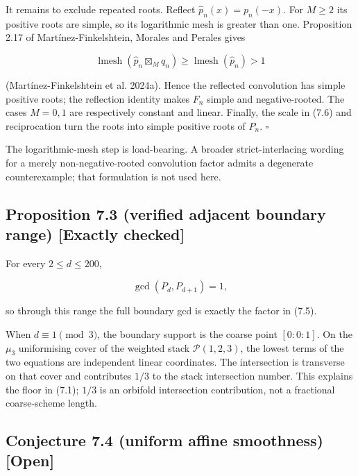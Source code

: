 \documentclass[
]{article}
\begin{document}
It remains to exclude repeated roots. Reflect
\(\widehat p_n(x)=p_n(-x)\). For \(M\ge2\) its positive roots are
simple, so its logarithmic mesh is greater than one. Proposition 2.17 of
Martínez-Finkelshtein, Morales and Perales gives

\[
\operatorname{lmesh}(\widehat p_n\boxtimes_Mq_n)
\ge \operatorname{lmesh}(\widehat p_n)>1
\]

(Martínez-Finkelshtein et al. 2024a). Hence the reflected convolution
has simple positive roots; the reflection identity makes \(F_n\) simple
and negative-rooted. The cases \(M=0,1\) are respectively constant and
linear. Finally, the scale in (7.6) and reciprocation turn the roots
into simple positive roots of \(P_n\). \(\square\)

The logarithmic-mesh step is load-bearing. A broader strict-interlacing
wording for a merely non-negative-rooted convolution factor admits a
degenerate counterexample; that formulation is not used here.

\subsection*{Proposition 7.3 (verified adjacent boundary range)
{[}Exactly
checked{]}}\label{proposition-7.3-verified-adjacent-boundary-range-exactly-checked}

For every \(2\le d\le200\),

\[
\gcd(P_d,P_{d+1})=1,
\]

so through this range the full boundary gcd is exactly the factor in
(7.5).

When \(d\equiv1\pmod3\), the boundary support is the coarse point
\([0:0:1]\). On the \(\mu_3\) uniformising cover of the weighted stack
\(\mathcal P(1,2,3)\), the lowest terms of the two equations are
independent linear coordinates. The intersection is transverse on that
cover and contributes \(1/3\) to the stack intersection number. This
explains the floor in (7.1); \(1/3\) is an orbifold intersection
contribution, not a fractional coarse-scheme length.

\subsection*{Conjecture 7.4 (uniform affine smoothness)
{[}Open{]}}\label{conjecture-7.4-uniform-affine-smoothness-open}
\end{document}
